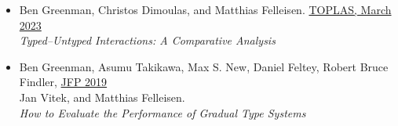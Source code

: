 \documentclass[11pt]{article}
\begin{document}


\begin{itemize}
\item
  Ben Greenman, Christos Dimoulas, and Matthias Felleisen. \hfill \href{https://dl.acm.org/doi/10.1145/3579833}{TOPLAS, March 2023} \\
  \emph{Typed--Untyped Interactions: A Comparative Analysis}
\item
  Ben Greenman, Asumu Takikawa, Max S. New, Daniel Feltey, Robert Bruce Findler, \hfill \href{https://www.cambridge.org/core/journals/journal-of-functional-programming/article/abs/how-to-evaluate-the-performance-of-gradual-type-systems/DC765724C52A3A462F16C7FB3AD18697}{JFP 2019} \\
  Jan Vitek, and Matthias Felleisen. \\
  \emph{How to Evaluate the Performance of Gradual Type Systems}
\end{itemize}
\end{document}

